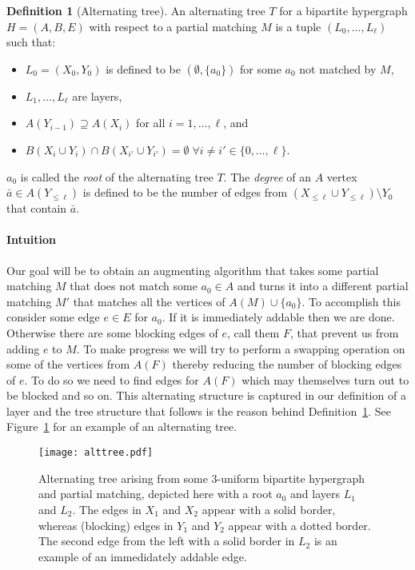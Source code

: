 \documentclass[11pt]{article}
\theoremstyle{definition}
\newtheorem{definition}[theorem]{Definition}
\theoremstyle{remark}
\begin{document}
\begin{definition}[Alternating tree]\label{def:alttree}
  An alternating tree $T$ for a bipartite hypergraph $H = (A, B, E)$
  with respect to a partial matching $M$ is a tuple 
  $(L_0,\dots,L_\ell)$ such that:
  \begin{itemize}
  \item $L_0 =(X_0, Y_0)$ is defined to be $(\emptyset, \{a_0\})$ for some 
  $a_0$ not matched by $M$,
  \item $L_1,\dots,L_\ell$ are layers,
\item $A(Y_{i-1}) \supseteq  A(X_i)$ for all $i=1,\dots,\ell$, and
\item $B(X_i \cup Y_i) \cap B(X_{i'}\cup Y_{i'}) = \emptyset \;
  \forall i \neq i' \in \{0,\dots,\ell\}$.
  \end{itemize}
  $a_0$ is called the \emph{root} of the alternating tree $T$. The
  \emph{degree} of an $A$ vertex $\bar{a} \in A(Y_{\leq \ell})$ is
  defined to be the number of edges from $(X_{\leq \ell} \cup Y_{\leq
    \ell}) \setminus Y_0$ that contain $\bar{a}$.
\end{definition}

\paragraph{Intuition} Our goal will be to obtain an augmenting
algorithm that takes some partial matching $M$ that does not match
some $a_0 \in A$ and turns it into a different partial matching $M'$
that matches all the vertices of $A(M)\cup \{a_0\}$. To accomplish
this consider some edge $e \in E$ for $a_0$. If it is immediately
addable then we are done. Otherwise there are some blocking edges of
$e$, call them $F$, that prevent us from adding $e$ to $M$. To make
progress we will try to perform a swapping operation on some of the
vertices from $A(F)$ thereby reducing the number of blocking edges of
$e$. To do so we need to find edges for $A(F)$ which may themselves
turn out to be blocked and so on. This alternating structure is
captured in our definition of a layer and the tree structure that
follows is the reason behind Definition~\ref{def:alttree}. See
Figure~\ref{figure:alttree} for an example of an alternating tree.

\begin{figure}
  \captionsetup{width=0.90\textwidth}
  \centering
  \texttt{[image: alttree.pdf]}
  \caption{Alternating tree arising from some $3$-uniform bipartite
    hypergraph and partial matching, depicted here with a root $a_0$ and layers $L_1$ and $L_2$. The
    edges in $X_1$ and $X_2$ appear with a solid border, whereas
    (blocking) edges in $Y_1$ and $Y_2$ appear with a dotted border. The second edge from
the left with a solid border in $L_2$ is an example of an immedidately addable edge.}
  \label{figure:alttree}
\end{figure}
\end{document}
